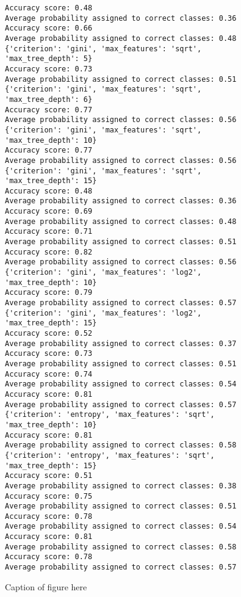 \begin{figure}[H]
\begin{verbatim}
Accuracy score: 0.48
Average probability assigned to correct classes: 0.36
Accuracy score: 0.66
Average probability assigned to correct classes: 0.48
{'criterion': 'gini', 'max_features': 'sqrt', 'max_tree_depth': 5}
Accuracy score: 0.73
Average probability assigned to correct classes: 0.51
{'criterion': 'gini', 'max_features': 'sqrt', 'max_tree_depth': 6}
Accuracy score: 0.77
Average probability assigned to correct classes: 0.56
{'criterion': 'gini', 'max_features': 'sqrt', 'max_tree_depth': 10}
Accuracy score: 0.77
Average probability assigned to correct classes: 0.56
{'criterion': 'gini', 'max_features': 'sqrt', 'max_tree_depth': 15}
Accuracy score: 0.48
Average probability assigned to correct classes: 0.36
Accuracy score: 0.69
Average probability assigned to correct classes: 0.48
Accuracy score: 0.71
Average probability assigned to correct classes: 0.51
Accuracy score: 0.82
Average probability assigned to correct classes: 0.56
{'criterion': 'gini', 'max_features': 'log2', 'max_tree_depth': 10}
Accuracy score: 0.79
Average probability assigned to correct classes: 0.57
{'criterion': 'gini', 'max_features': 'log2', 'max_tree_depth': 15}
Accuracy score: 0.52
Average probability assigned to correct classes: 0.37
Accuracy score: 0.73
Average probability assigned to correct classes: 0.51
Accuracy score: 0.74
Average probability assigned to correct classes: 0.54
Accuracy score: 0.81
Average probability assigned to correct classes: 0.57
{'criterion': 'entropy', 'max_features': 'sqrt', 'max_tree_depth': 10}
Accuracy score: 0.81
Average probability assigned to correct classes: 0.58
{'criterion': 'entropy', 'max_features': 'sqrt', 'max_tree_depth': 15}
Accuracy score: 0.51
Average probability assigned to correct classes: 0.38
Accuracy score: 0.75
Average probability assigned to correct classes: 0.51
Accuracy score: 0.78
Average probability assigned to correct classes: 0.54
Accuracy score: 0.81
Average probability assigned to correct classes: 0.58
Accuracy score: 0.78
Average probability assigned to correct classes: 0.57
\end{verbatim}
\caption{Caption of figure here}
\end{figure}

\newpage